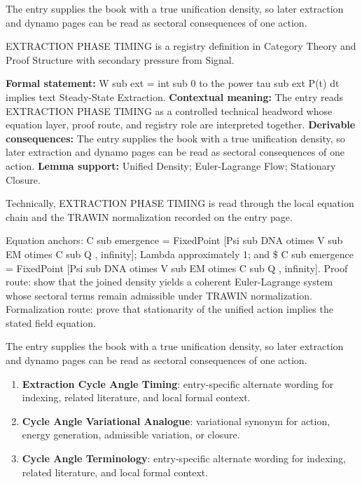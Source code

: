 The entry supplies the book with a true unification density, so later extraction and dynamo pages can be read as sectoral consequences of one action.
\clearpage


\begingroup\small
{}
EXTRACTION PHASE TIMING is a registry definition in Category Theory and Proof Structure with secondary pressure from Signal.

\begingroup\footnotesize\setlength{\emergencystretch}{3em}\sloppy
\textbf{Formal statement:} W sub ext = int sub 0 to the power tau sub ext P(t) dt implies text Steady-State Extraction. \textbf{Contextual meaning:} The entry reads EXTRACTION PHASE TIMING as a controlled technical headword whose equation layer, proof route, and registry role are interpreted together. \textbf{Derivable consequences:} The entry supplies the book with a true unification density, so later extraction and dynamo pages can be read as sectoral consequences of one action. \textbf{Lemma support:} Unified Density; Euler-Lagrange Flow; Stationary Closure.\par
\endgroup

Technically, EXTRACTION PHASE TIMING is read through the local equation chain and the TRAWIN normalization recorded on the entry page.

Equation anchors: C sub emergence = FixedPoint [Psi sub DNA otimes V sub EM otimes C sub Q , infinity]; Lambda approximately 1; and \$ C sub emergence = FixedPoint [Psi sub DNA otimes V sub EM otimes C sub Q , infinity]. Proof route: show that the joined density yields a coherent Euler-Lagrange system whose sectoral terms remain admissible under TRAWIN normalization. Formalization route: prove that stationarity of the unified action implies the stated field equation.

The entry supplies the book with a true unification density, so later extraction and dynamo pages can be read as sectoral consequences of one action.
\endgroup

\begin{enumerate}[leftmargin=1.6em,itemsep=6pt,topsep=4pt]
\item \textbf{Extraction Cycle Angle Timing}: entry-specific alternate wording for indexing, related literature, and local formal context.
\item \textbf{Cycle Angle Variational Analogue}: variational synonym for action, energy generation, admissible variation, or closure.
\item \textbf{Cycle Angle Terminology}: entry-specific alternate wording for indexing, related literature, and local formal context.
\end{enumerate}


